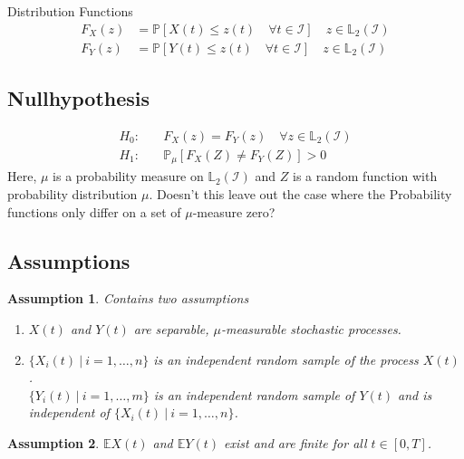 \documentclass[11pt,twoside,a4paper]{article}
\theoremstyle{assumpstyle} \newtheorem{assumption}{Assumption}
\theoremstyle{assumpstyle} \newtheorem{definition}{Definition}
\begin{document}
		Distribution Functions
		\begin{equation}
			\begin{split}
				F_X(z) &= \mathbb{P}\left[X(t) \leq z(t) \quad \forall t \in \mathcal{I}\right] \quad z \in \mathbb{L}_2(\mathcal{I})\\
				F_Y(z) &= \mathbb{P}\left[Y(t) \leq z(t) \quad \forall t \in \mathcal{I}\right] \quad z \in \mathbb{L}_2(\mathcal{I})
			\end{split}
		\end{equation}
	
		\subsection{Nullhypothesis}
			\begin{equation}
				\begin{split}
					H_0: \quad &F_X(z) = F_Y(z) \quad \forall z \in \mathbb{L}_2(\mathcal{I}) \\
					H_1: \quad &\mathbb{P}_{\mu}\left[F_X(Z) \neq F_Y(Z)\right] > 0
				\end{split}
			\end{equation}
			Here, $\mu$ is a probability measure on $\mathbb{L}_2(\mathcal{I})$ and $Z$ is a random function with probability distribution $\mu$. {\color{red} Doesn't this leave out the case where the Probability functions only differ on a set of $\mu$-measure zero?}
		
		\subsection{Assumptions}
		
			\begin{assumption} Contains two assumptions
				\begin{enumerate}
					\item $X(t)$ and $Y(t)$ are separable, $\mu$-measurable stochastic processes.
					\item $\{X_i(t) \: \vert \: i = 1, \dots, n\}$ is an independent random sample of the process $X(t)$. \\
					$\{Y_i(t) \: \vert \: i = 1, \dots, m\}$ is an independent random sample of $Y(t)$ and is independent of $\{X_i(t) \: \vert \: i = 1, \dots, n\}$.
				\end{enumerate}
			\end{assumption}
		
			\begin{assumption}
				$\mathbb{E}X(t)$ and $\mathbb{E}Y(t)$ exist and are finite for all $t \in [0, T]$.
			\end{assumption}
		
\end{document}
